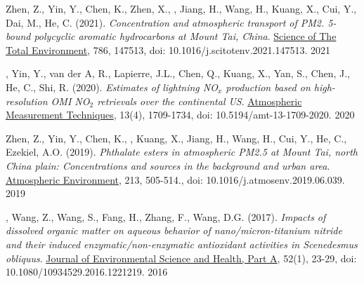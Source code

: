 \begin{cvpublications}

\publication
{Zhen, Z., Yin, Y., Chen, K., Zhen, X., ,
Jiang, H., Wang, H., Kuang, X., Cui, Y., Dai, M., He, C. (2021).
\emph{Concentration and atmospheric transport of PM2. 5-bound polycyclic aromatic hydrocarbons at Mount Tai, China}.
\underline{Science of The Total Environment}, 786, 147513,
doi: 10.1016/j.scitotenv.2021.147513.} %
{2021} %

\publication
{, Yin, Y., van der A, R., Lapierre, J.L.,
Chen, Q., Kuang, X., Yan, S., Chen, J., He, C., Shi, R. (2020).
\emph{Estimates of lightning NO$_x$ production based on high-resolution OMI NO$_2$ retrievals over the continental US}.
\underline{Atmospheric Measurement Techniques}, 13(4), 1709-1734,
doi: 10.5194/amt-13-1709-2020.} %
{2020} %

\publication
{Zhen, Z., Yin, Y., Chen, K., ,
Kuang, X., Jiang, H., Wang, H., Cui, Y., He, C., Ezekiel, A.O. (2019).
\emph{Phthalate esters in atmospheric PM2.5 at Mount Tai, north China plain:
Concentrations and sources in the background and urban area}.
\underline{Atmospheric Environment},
213, 505-514.,
doi: 10.1016/j.atmosenv.2019.06.039.} %
{2019} %

\publication
{, Wang, Z., Wang, S., Fang, H., Zhang, F., Wang, D.G. (2017).
\emph{Impacts of dissolved organic matter on aqueous behavior of nano/micron-titanium nitride and their induced enzymatic/non-enzymatic antioxidant activities in Scenedesmus obliquus}.
\underline{Journal of Environmental Science and Health, Part A},
52(1), 23-29,
doi: 10.1080/10934529.2016.1221219.} %
{2016} %

\end{cvpublications}
